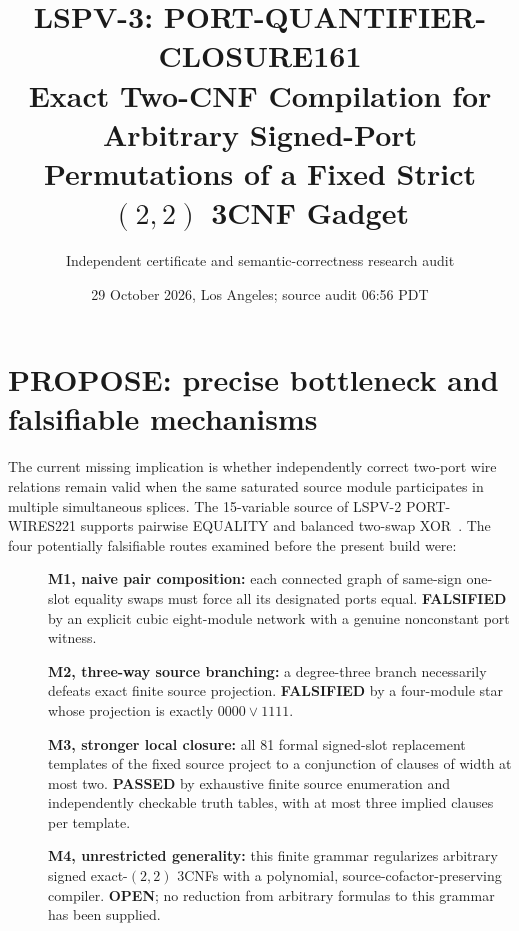 \documentclass[11pt]{article}
\title{LSPV-3: PORT-QUANTIFIER-CLOSURE161\\[3pt]
\large Exact Two-CNF Compilation for Arbitrary Signed-Port Permutations of a Fixed Strict $(2,2)$ 3CNF Gadget}
\author{Independent certificate and semantic-correctness research audit}
\date{29 October 2026, Los Angeles; source audit 06:56 PDT}
\begin{document}
\maketitle
\noindent{}

\section{PROPOSE: precise bottleneck and falsifiable mechanisms}
The current missing implication is whether independently correct two-port wire relations remain valid when the same saturated source module participates in multiple simultaneous splices. The 15-variable source of LSPV-2 PORT-WIRES221 supports pairwise EQUALITY and balanced two-swap XOR~\cite{lspv2}. The four potentially falsifiable routes examined before the present build were:
\begin{description}
\item[]\textbf{M1, naive pair composition:} each connected graph of same-sign one-slot equality swaps must force all its designated ports equal. \textbf{FALSIFIED} by an explicit cubic eight-module network with a genuine nonconstant port witness.
\item[]\textbf{M2, three-way source branching:} a degree-three branch necessarily defeats exact finite source projection. \textbf{FALSIFIED} by a four-module star whose projection is exactly $0000\lor1111$.
\item[]\textbf{M3, stronger local closure:} all 81 formal signed-slot replacement templates of the fixed source project to a conjunction of clauses of width at most two. \textbf{PASSED} by exhaustive finite source enumeration and independently checkable truth tables, with at most three implied clauses per template.
\item[]\textbf{M4, unrestricted generality:} this finite grammar regularizes arbitrary signed exact-$(2,2)$ 3CNFs with a polynomial, source-cofactor-preserving compiler. \textbf{OPEN}; no reduction from arbitrary formulas to this grammar has been supplied.
\end{description}
\end{document}
